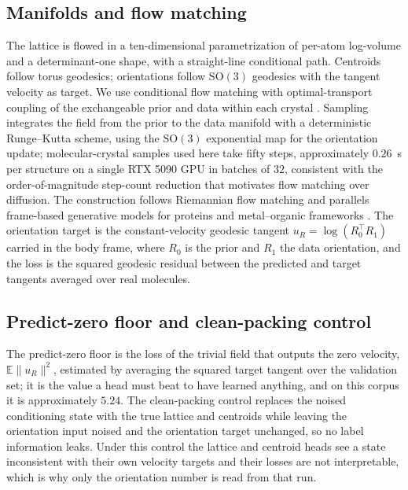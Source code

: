 \documentclass[10pt]{article}
\begin{document}
\subsection{Manifolds and flow matching}
The lattice is flowed in a ten-dimensional parametrization of per-atom
log-volume and a determinant-one shape, with a straight-line conditional path.
Centroids follow torus geodesics; orientations follow $\mathrm{SO}(3)$
geodesics with the tangent velocity as target. We use conditional flow
matching \citep{lipman2023flowmatching} with optimal-transport coupling of the
exchangeable prior and data within each crystal \citep{pooladian2023multisample}.
Sampling integrates the field from the prior to the data manifold with a
deterministic Runge--Kutta scheme, using the $\mathrm{SO}(3)$ exponential map
for the orientation update; molecular-crystal samples used here take fifty
steps, approximately $0.26$~s per structure on a single RTX 5090 GPU in batches
of $32$, consistent with the order-of-magnitude step-count reduction that
motivates flow matching over diffusion. The construction follows Riemannian flow
matching \citep{chen2024riemannian} and parallels frame-based generative models
for proteins \citep{yim2023se3diffusion,yim2023frameflow} and metal--organic
frameworks \citep{kim2025mofflow}. The orientation target is the constant-velocity
geodesic tangent $u_R = \log(R_0^\top R_1)$ carried in the body frame, where
$R_0$ is the prior and $R_1$ the data orientation, and the loss is the squared
geodesic residual between the predicted and target tangents averaged over real
molecules.

\subsection{Predict-zero floor and clean-packing control}
The predict-zero floor is the loss of the trivial field that outputs the zero
velocity, $\mathbb{E}\lVert u_R\rVert^2$, estimated by averaging the squared
target tangent over the validation set; it is the value a head must beat to have
learned anything, and on this corpus it is approximately $5.24$. The
clean-packing control replaces the noised conditioning state with the true
lattice and centroids while leaving the orientation input noised and the
orientation target unchanged, so no label information leaks. Under this control
the lattice and centroid heads see a state inconsistent with their own velocity
targets and their losses are not interpretable, which is why only the orientation
number is read from that run.
\end{document}
